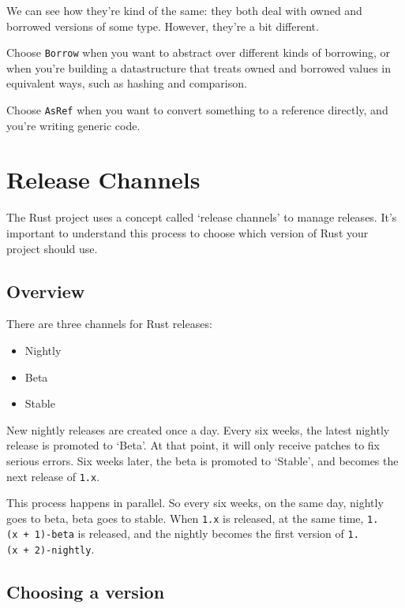 \documentclass[a4paper,]{book}
\begin{document}
We can see how they're kind of the same: they both deal with owned and
borrowed versions of some type. However, they're a bit different.

Choose \texttt{Borrow} when you want to abstract over different kinds of
borrowing, or when you're building a datastructure that treats owned and
borrowed values in equivalent ways, such as hashing and comparison.

Choose \texttt{AsRef} when you want to convert something to a reference
directly, and you're writing generic code.

\section{Release Channels}\label{sec--release-channels}

The Rust project uses a concept called `release channels' to manage
releases. It's important to understand this process to choose which
version of Rust your project should use.

\subsection{Overview}\label{overview}

There are three channels for Rust releases:

\begin{itemize}
\itemsep1pt\parskip0pt
\item
  Nightly
\item
  Beta
\item
  Stable
\end{itemize}

New nightly releases are created once a day. Every six weeks, the latest
nightly release is promoted to `Beta'. At that point, it will only
receive patches to fix serious errors. Six weeks later, the beta is
promoted to `Stable', and becomes the next release of \texttt{1.x}.

This process happens in parallel. So every six weeks, on the same day,
nightly goes to beta, beta goes to stable. When \texttt{1.x} is
released, at the same time, \texttt{1.(x\ +\ 1)-beta} is released, and
the nightly becomes the first version of \texttt{1.(x\ +\ 2)-nightly}.

\subsection{Choosing a version}\label{choosing-a-version}
\end{document}
